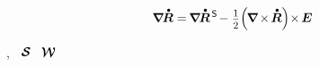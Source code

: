 \nopagebreak\vspace{-0.1em}\begin{equation*}
\boldnabla \hspace{-0.16ex} \mathdotabove{\bm{R}}
= \hspace{-0.2ex} \boldnabla \hspace{-0.16ex} \mathdotabove{\bm{R}}^{\hspace{.3ex}\mathsf{S}} \hspace{-0.25ex}
- \hspace{.1ex} \smalldisplaystyleonehalf \hspace{-0.33ex} \left( \hspace{-0.2ex} \boldnabla \hspace{-0.15ex}\times\hspace{-0.25ex} \mathdotabove{\bm{R}} \right) \hspace{-0.4ex} \times \hspace{-0.2ex} \bm{E}
\end{equation*}

\noindent {},  ~${\bm{\mathcal{S}}}$  ~${\vorticitytensor}$

